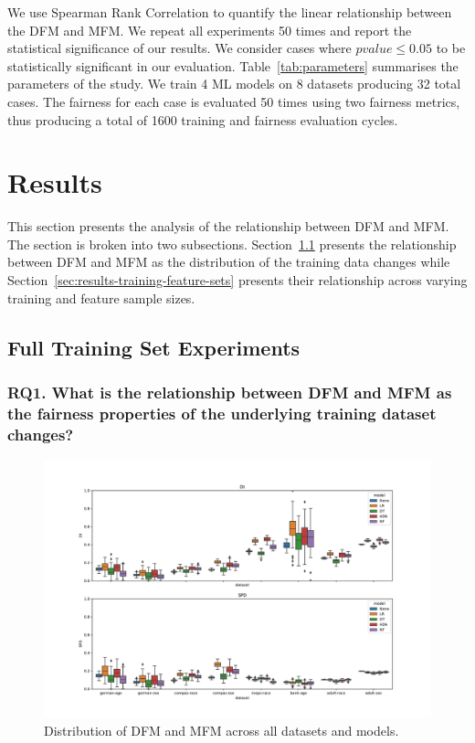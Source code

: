 \documentclass{article}
\begin{document}
We use Spearman Rank Correlation to quantify the linear relationship
between the DFM and MFM. We repeat all experiments 50 times and report
the statistical significance of our results. We consider cases where
$pvalue\le0.05$ to be statistically significant in our
evaluation. Table \ref{tab:parameters} summarises the parameters of
the study. We train 4 ML models on 8 datasets producing 32 total
cases. The fairness for each case is evaluated 50 times using two
fairness metrics, thus producing a total of 1600 training and fairness
evaluation cycles.

\section{Results}\label{sec:results}

This section presents the analysis of the relationship between DFM and
MFM. The section is broken into two
subsections. Section \ref{sec:results-full} presents the relationship
between DFM and MFM as the distribution of the training data changes
while Section \ref{sec:results-training-feature-sets} presents their
relationship across varying training and feature sample sizes.

\subsection{Full Training Set Experiments}\label{sec:results-full}
\subsubsection{RQ1. What is the relationship between DFM and MFM as
the fairness properties of the underlying training dataset changes?}\label{sec:results-full-rel}

\begin{figure}
  \centering
  \includegraphics[width=0.95\linewidth]{boxplot--dataset--di-spd--exp-full.pdf}
  \caption{Distribution of DFM and MFM across all datasets and models.}
  \label{fig:boxplot--dataset--di-spd--exp-full}
\end{figure}
\end{document}

